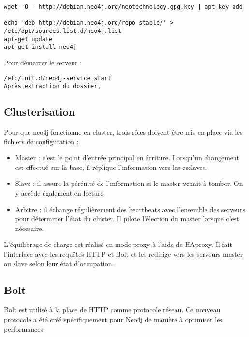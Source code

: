 \begin{lstlisting}
wget -O - http://debian.neo4j.org/neotechnology.gpg.key | apt-key add -
echo 'deb http://debian.neo4j.org/repo stable/' > /etc/apt/sources.list.d/neo4j.list
apt-get update
apt-get install neo4j
\end{lstlisting}

Pour démarrer le serveur :
\begin{lstlisting}
/etc/init.d/neo4j-service start
Après extraction du dossier, 
\end{lstlisting}

\subsection{Clusterisation}

Pour que neo4j fonctionne en cluster, trois rôles doivent être mis en place via les fichiers de configuration :

\begin{itemize}
      \item Master : c'est le point d'entrée principal en écriture. Lorsqu'un changement est effectué sur la base, il réplique l'information vers les esclaves.
      \item Slave : il assure la pérénité de l'information si le master venait à tomber. On y accède également en lecture.
      \item Arbitre : il échange régulièrement des heartbeats avec l'ensemble des serveurs pour déterminer l'état du cluster. Il pilote l'élection du master lorsque c'est nécesaire.
\end{itemize}

L'équilibrage de charge est réalisé en mode proxy à l'aide de HAproxy. Il fait l'interface avec les requêtes HTTP et Bolt et les redirige vers les serveurs master ou slave selon leur état d'occupation.

\subsection{Bolt}

Bolt est utilisé à la place de HTTP comme protocole réseau. Ce nouveau protocole a été créé spécifiquement pour Neo4j de manière à optimiser les performances.

